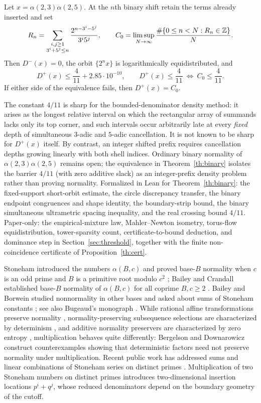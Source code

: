\documentclass[11pt]{article}
\begin{document}
\begin{maintheorem}\label{th:binary}
Let $x=\alpha(2,3)\alpha(2,5)$. At the $n$th binary shift retain the terms already inserted and set
\[
 R_n=\sum_{\substack{i,j\ge1\\3^i+5^j\le n}}
       \frac{2^{n-3^i-5^j}}{3^i5^j},\qquad
 C_0=\limsup_{N\to\infty}\frac{\#\{0\le n<N:R_n\in\mathbb Z\}}{N}.
\]
Then $D^-(x)=0$, the orbit $\{2^n x\}$ is logarithmically equidistributed, and
\[
 D^+(x)\le \frac4{11}+2.85\cdot10^{-10},\qquad
 D^+(x)\le\frac4{11}\ \Longleftrightarrow\ C_0\le\frac4{11}.
\]
If either side of the equivalence fails, then $D^+(x)=C_0$.
\end{maintheorem}

The constant $4/11$ is sharp for the bounded-denominator density method: it arises as the longest relative interval on which the rectangular array of summands lacks only its top corner, and such intervals occur arbitrarily late at every \emph{fixed} depth of simultaneous $3$-adic and $5$-adic cancellation. It is not known to be sharp for $D^+(x)$ itself. By contrast, an integer shifted prefix requires cancellation depths growing linearly with both shell indices. Ordinary binary normality of $\alpha(2,3)\alpha(2,5)$ remains open; the equivalence in Theorem~\ref{th:binary} isolates the barrier $4/11$ (with zero additive slack) as an integer-prefix density problem rather than proving normality. Formalized in Lean for Theorem~\ref{th:binary}: the fixed-support short-orbit estimate, the circle discrepancy transfer, the binary endpoint congruences and shape identity, the boundary-strip bound, the binary simultaneous ultrametric spacing inequality, and the real crossing bound $4/11$. Paper-only: the empirical-mixture law, Mahler--Newton isometry, torus-flow equidistribution, tower-sparsity count, certificate-to-bound deduction, and dominance step in Section~\ref{sec:threshold}, together with the finite non-coincidence certificate of Proposition~\ref{th:cert}.

Stoneham introduced the numbers $\alpha(B,c)$ and proved base-$B$ normality when $c$ is an odd prime and $B$ is a primitive root modulo $c^2$ \cite{stoneham}; Bailey and Crandall established base-$B$ normality of $\alpha(B,c)$ for all coprime $B,c\ge2$ \cite{bc}. Bailey and Borwein studied nonnormality in other bases and asked about sums of Stoneham constants \cite{bb}; see also Bugeaud's monograph \cite{bugeaud}. While rational affine transformations preserve normality \cite{wall}, normality-preserving subsequence selections are characterized by determinism \cite{kamae,weiss}, and additive normality preservers are characterized by zero entropy \cite{rauzy,weiss}, multiplication behaves quite differently: Bergelson and Downarowicz \cite{bd} construct counterexamples showing that deterministic factors need not preserve normality under multiplication. Recent public work has addressed sums and linear combinations of Stoneham series on distinct primes \cite{twosum,mira}. Multiplication of two Stoneham numbers on distinct primes introduces two-dimensional insertion locations $p^i+q^j$, whose reduced denominators depend on the boundary geometry of the cutoff.
\end{document}
